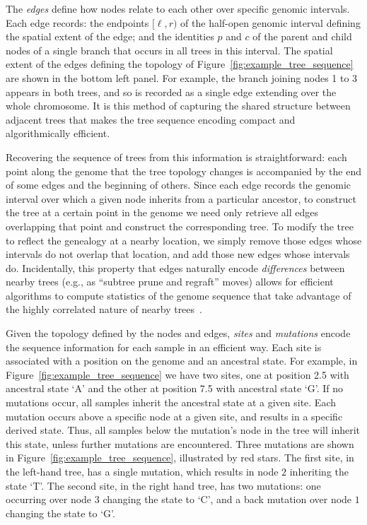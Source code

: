 \documentclass{article}
\begin{document}
The \emph{edges} define how nodes relate to each other over specific genomic intervals.
Each edge records:
the endpoints $[\ell, r)$ of the half-open genomic interval defining the
spatial extent of the edge;
and the identities $p$ and $c$ of the parent and child nodes
of a single branch that occurs in all trees in this interval.
The spatial extent of the edges defining the topology of Figure~\ref{fig:example_tree_sequence}
are shown in the bottom left panel.
For example, the branch joining nodes 1 to 3 appears in both trees,
and so is recorded as a single edge extending over the whole chromosome.
It is this method of capturing the shared structure between adjacent trees that makes the
tree sequence encoding compact and algorithmically efficient.

Recovering the sequence of trees from this information is straightforward:
each point along the genome that the tree topology changes
is accompanied by the end of some {edges} and the beginning of others.
Since each {edge} records the genomic interval
over which a given node inherits from a particular ancestor,
to construct the tree at a certain point in the genome
we need only retrieve all edges overlapping that point
and construct the corresponding tree.
To modify the tree to reflect the genealogy at a nearby location,
we simply remove those edges whose intervals do not overlap that location,
and add those new edges whose intervals do.
Incidentally, this property that edges naturally encode \emph{differences}
between nearby trees (e.g., as ``subtree prune and regraft'' moves)
allows for efficient algorithms to compute statistics of the genome sequence that take advantage
of the highly correlated nature of nearby trees~\citep{kelleher2016efficient}.

Given the topology defined by the nodes and edges, \emph{sites} and \emph{mutations}
encode the sequence information for each sample in an efficient way. Each site
is associated with a position on the genome and an ancestral state. For example,
in Figure~\ref{fig:example_tree_sequence} we have two sites, one at position
2.5 with ancestral state `A' and the other at position 7.5 with ancestral state `G'. If
no mutations occur, all samples inherit the ancestral state at a given site.
Each mutation occurs above a specific node at a given site,
and results in a specific derived state.
Thus, all samples below the mutation's node in the tree will inherit this state,
unless further mutations are encountered.
Three mutations are shown in Figure~\ref{fig:example_tree_sequence},
illustrated by red stars.
The first site, in the left-hand tree,
has a single mutation, which results in node $2$ inheriting the state `T'.
The second site, in the right hand tree, has two mutations:
one occurring over node $3$ changing the state to `C',
and a back mutation over node $1$ changing the state to `G'.
\end{document}
